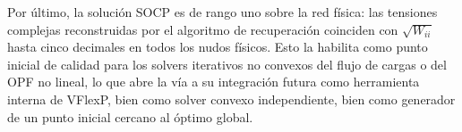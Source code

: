 \documentclass[12pt,a4paper]{iit-project-draft-report}
\begin{document}
Por último, la solución \gls{SOCP} es de rango uno sobre la red física:
las tensiones complejas reconstruidas por el algoritmo de recuperación
coinciden con $\sqrt{W_{ii}}$ hasta cinco decimales en todos los nudos
físicos. Esto la habilita como punto inicial de calidad para los solvers
iterativos no convexos del flujo de cargas o del \gls{OPF} no lineal, lo
que abre la vía a su integración futura como herramienta interna de
\gls{VFlexP}, bien como solver convexo independiente, bien como
generador de un punto inicial cercano al óptimo global.



\end{document}
